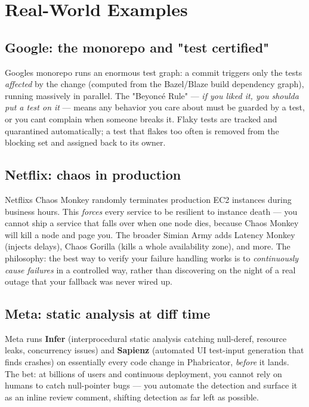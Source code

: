 \documentclass[11pt]{article}
\begin{document}
\section{Real-World Examples}\label{real-world-examples}

\subsection{Google: the monorepo and "test certified"}\label{google-the-monorepo-and-test-certified}

Google\textquotesingle s monorepo runs an enormous test graph: a commit triggers only the tests \emph{affected} by the change (computed from the Bazel/Blaze build dependency graph), running massively in parallel. The "Beyoncé Rule" --- \emph{if you liked it, you shoulda put a test on it} --- means any behavior you care about must be guarded by a test, or you can\textquotesingle t complain when someone breaks it. Flaky tests are tracked and quarantined automatically; a test that flakes too often is removed from the blocking set and assigned back to its owner.

\subsection{Netflix: chaos in production}\label{netflix-chaos-in-production}

Netflix\textquotesingle s Chaos Monkey randomly terminates production EC2 instances during business hours. This \emph{forces} every service to be resilient to instance death --- you cannot ship a service that falls over when one node dies, because Chaos Monkey will kill a node and page you. The broader Simian Army adds Latency Monkey (injects delays), Chaos Gorilla (kills a whole availability zone), and more. The philosophy: the best way to verify your failure handling works is to \emph{continuously cause failures} in a controlled way, rather than discovering on the night of a real outage that your fallback was never wired up.

\subsection{Meta: static analysis at diff time}\label{meta-static-analysis-at-diff-time}

Meta runs \textbf{Infer} (interprocedural static analysis catching null-deref, resource leaks, concurrency issues) and \textbf{Sapienz} (automated UI test-input generation that finds crashes) on essentially every code change in Phabricator, \emph{before} it lands. The bet: at billions of users and continuous deployment, you cannot rely on humans to catch null-pointer bugs --- you automate the detection and surface it as an inline review comment, shifting detection as far left as possible.
\end{document}
